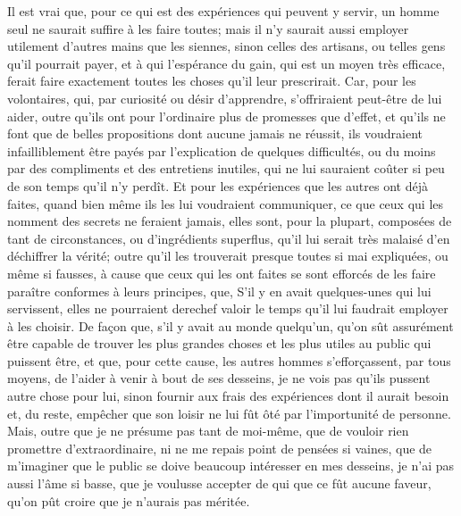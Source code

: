 \documentclass[french,twoside]{book} %
\begin{document}
Il est vrai que, pour ce qui est des expériences qui peuvent y servir, un homme seul ne saurait suffire à les faire toutes; mais il n'y saurait aussi employer utilement d'autres mains que les siennes, sinon celles des artisans, ou telles gens qu'il pourrait payer, et à qui l'espérance du gain, qui est un moyen très efficace, ferait faire exactement toutes les choses qu'il leur prescrirait. Car, pour les volontaires, qui, par curiosité ou désir d'apprendre, s'offriraient peut-être de lui aider, outre qu'ils ont pour l'ordinaire plus de promesses que d'effet, et qu'ils ne font que de belles propositions dont aucune jamais ne réussit, ils voudraient infailliblement être payés par l'explication de quelques difficultés, ou du moins par des compliments et des entretiens inutiles, qui ne lui sauraient coûter si peu de son temps qu'il n'y perdît. Et pour les expériences que les autres ont déjà faites, quand bien même ils les lui voudraient communiquer, ce que ceux qui les nomment des secrets ne feraient jamais, elles sont, pour la plupart, composées de tant de circonstances, ou d'ingrédients superflus, qu'il lui serait très malaisé d'en déchiffrer la vérité; outre qu'il les trouverait presque toutes si mai expliquées, ou même si fausses, à cause que ceux qui les ont faites se sont efforcés de les faire paraître conformes à leurs principes, que, S'il y en avait quelques-unes qui lui servissent, elles ne pourraient derechef valoir le temps qu'il lui faudrait employer à les choisir. De façon que, s'il y avait au monde quelqu'un, qu'on sût assurément être capable de trouver les plus grandes choses et les plus utiles au public qui puissent être, et que, pour cette cause, les autres hommes s'efforçassent, par tous moyens, de l'aider à venir à bout de ses desseins, je ne vois pas qu'ils pussent autre chose pour lui, sinon fournir aux frais des expériences dont il aurait besoin et, du reste, empêcher que son loisir ne lui fût ôté par l'importunité de personne. Mais, outre que je ne présume pas tant de moi-même, que de vouloir rien promettre d'extraordinaire, ni ne me repais point de pensées si vaines, que de m'imaginer que le public se doive beaucoup intéresser en mes desseins, je n'ai pas aussi l'âme si basse, que je voulusse accepter de qui que ce fût aucune faveur, qu'on pût croire que je n'aurais pas méritée.\par
\end{document}
